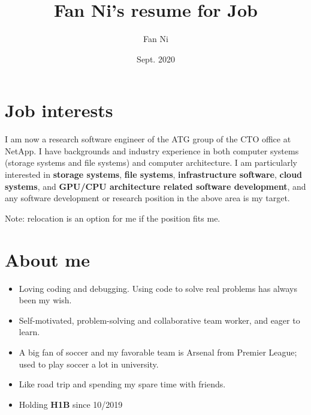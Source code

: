 \documentclass{article}
\title{Fan Ni's resume for Job}
\author{Fan Ni}
\date{Sept. 2020}
\begin{document}

\makecvtitle %

\section{Job interests}
I am now a research software engineer of the ATG group of the CTO office at NetApp. I have backgrounds and industry experience in both computer systems (storage systems and file systems) and computer architecture. I am particularly interested in \textbf{storage systems}, \textbf{file systems}, \textbf{infrastructure software}, \textbf{cloud systems}, and \textbf{GPU/CPU architecture related software development}, and any software development or research position in the above area is my target.

Note: relocation is an option for me if the position fits me.

\section{About me}
\begin{itemize}
    \item Loving coding and debugging. Using code to solve real problems has always been my wish. 
    \item Self-motivated, problem-solving and collaborative team worker, and eager to learn.
    \item A big fan of soccer and my favorable team is Arsenal from Premier League; used to play soccer a lot in university. 
    \item Like road trip and spending my spare time with friends.
    \item Holding \textbf{H1B} since 10/2019
\end{itemize}
\end{document}

